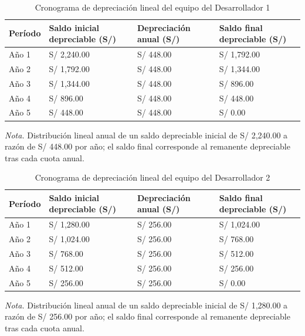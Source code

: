 \begin{table}[htbp]
\centering
\caption{Cronograma de depreciación lineal del equipo del Desarrollador 1}
\label{tab:deprec_dev1_anios}
\begin{tabularx}{\textwidth}{@{}>{\raggedright\arraybackslash}p{2.2cm} >{\raggedleft\arraybackslash}X >{\raggedleft\arraybackslash}p{3.2cm} >{\raggedleft\arraybackslash}X@{}}
\toprule
\textbf{Período} & \textbf{Saldo inicial depreciable (S/)} & \textbf{Depreciación anual (S/)} & \textbf{Saldo final depreciable (S/)} \\
\midrule
Año 1 & S/ 2,240.00 & S/ 448.00 & S/ 1,792.00 \\
Año 2 & S/ 1,792.00 & S/ 448.00 & S/ 1,344.00 \\
Año 3 & S/ 1,344.00 & S/ 448.00 & S/ 896.00 \\
Año 4 & S/ 896.00 & S/ 448.00 & S/ 448.00 \\
Año 5 & S/ 448.00 & S/ 448.00 & S/ 0.00 \\
\bottomrule
\end{tabularx}
\par\vspace{0.3em}
\raggedright\footnotesize{\textit{Nota.} Distribución lineal anual de un saldo depreciable inicial de S/ 2,240.00 a razón de S/ 448.00 por año; el saldo final corresponde al remanente depreciable tras cada cuota anual.}
\end{table}

\begin{table}[htbp]
\centering
\caption{Cronograma de depreciación lineal del equipo del Desarrollador 2}
\label{tab:deprec_dev2_anios}
\begin{tabularx}{\textwidth}{@{}>{\raggedright\arraybackslash}p{2.2cm} >{\raggedleft\arraybackslash}X >{\raggedleft\arraybackslash}p{3.2cm} >{\raggedleft\arraybackslash}X@{}}
\toprule
\textbf{Período} & \textbf{Saldo inicial depreciable (S/)} & \textbf{Depreciación anual (S/)} & \textbf{Saldo final depreciable (S/)} \\
\midrule
Año 1 & S/ 1,280.00 & S/ 256.00 & S/ 1,024.00 \\
Año 2 & S/ 1,024.00 & S/ 256.00 & S/ 768.00 \\
Año 3 & S/ 768.00 & S/ 256.00 & S/ 512.00 \\
Año 4 & S/ 512.00 & S/ 256.00 & S/ 256.00 \\
Año 5 & S/ 256.00 & S/ 256.00 & S/ 0.00 \\
\bottomrule
\end{tabularx}
\par\vspace{0.3em}
\raggedright\footnotesize{\textit{Nota.} Distribución lineal anual de un saldo depreciable inicial de S/ 1,280.00 a razón de S/ 256.00 por año; el saldo final corresponde al remanente depreciable tras cada cuota anual.}
\end{table}

